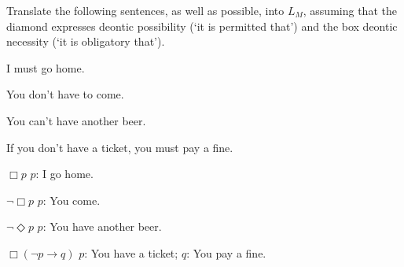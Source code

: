 \begin{exercise}
  Translate the following sentences, as well as possible, into $L_{M}$, assuming
  that the diamond expresses deontic possibility (`it is permitted that') and
  the box deontic necessity (`it is obligatory that').
  \begin{exlist}
  \item I must go home.
  \item You don't have to come.
  \item You can't have another beer.
  \item If you don't have a ticket, you must pay a fine.
  \end{exlist}
\end{exercise}
\begin{solution}
  \begin{sollist}
    \item $\Box p$ \quad  $p$: I go home.
    \item $\neg \Box p$ \quad  $p$: You come.
    \item $\neg\Diamond p$ \quad  $p$: You have another beer.
    \item $\Box(\neg p \to q)$ \quad  $p$: You have a ticket; $q$: You pay a fine.
  \end{sollist}
\end{solution}

